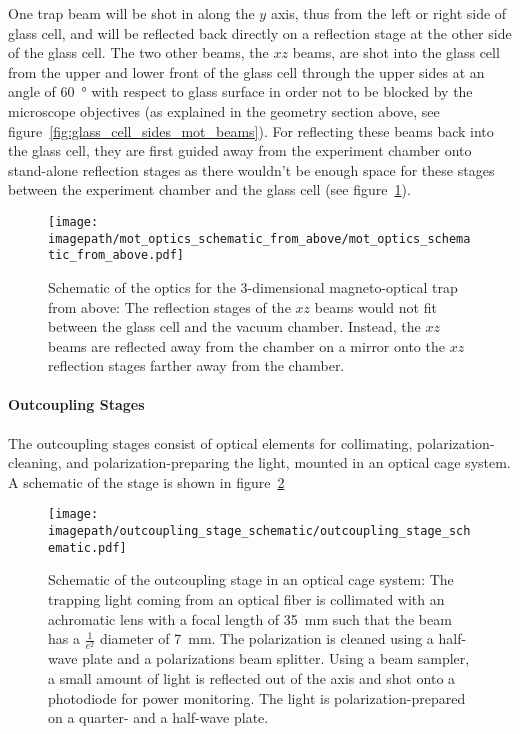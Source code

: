 One trap beam will be shot in along the $y$ axis,  thus from the left or right side of glass cell, and will be reflected back directly on a reflection stage at the other side of the glass cell. The two other beams, the $xz$ beams, are shot into the glass cell from the upper and lower front of the glass cell through the upper sides at an angle of \SI{60}{\degree} with respect to glass surface in order not to be blocked by the microscope objectives (as explained in the geometry section above, see figure~\ref{fig:glass_cell_sides_mot_beams}). For reflecting these beams back into the glass cell, they are first guided away from the experiment chamber onto stand-alone reflection stages as there wouldn't be enough space for these stages between the experiment chamber and the glass cell (see figure~\ref{fig:mot_optics_schematic_from_above}).

\begin{figure}
    \centering
    \texttt{[image: \\imagepath/mot\_optics\_schematic\_from\_above/mot\_optics\_schematic\_from\_above.pdf]}
    \caption{Schematic of the optics for the 3-dimensional magneto-optical trap from above: The reflection stages of the $xz$ beams would not fit between the glass cell and the vacuum chamber. Instead, the $xz$ beams are reflected away from the chamber on a mirror onto the $xz$ reflection stages farther away from the chamber.
    }
    \label{fig:mot_optics_schematic_from_above}
\end{figure}

\paragraph{Outcoupling Stages}
The outcoupling stages consist of optical elements for collimating, polarization-cleaning, and polarization-preparing the light, mounted in an optical cage system. A schematic of the stage is shown in figure~\ref{fig:outcoupling_stage_schematic}

\begin{figure}
    \centering
    \texttt{[image: \\imagepath/outcoupling\_stage\_schematic/outcoupling\_stage\_schematic.pdf]}
    \caption{Schematic of the outcoupling stage in an optical cage system: The trapping light coming from an optical fiber is collimated with an achromatic lens with a focal length of \SI{35}{\milli\meter} such that the beam has a $\frac{1}{e^2}$ diameter of \SI{7}{\milli\meter}. The polarization is cleaned using a half-wave plate and a polarizations beam splitter. Using a beam sampler, a small amount of light is reflected out of the axis and shot onto a photodiode for power monitoring. The light is polarization-prepared on a quarter- and a half-wave plate.}
    \label{fig:outcoupling_stage_schematic}
\end{figure}

